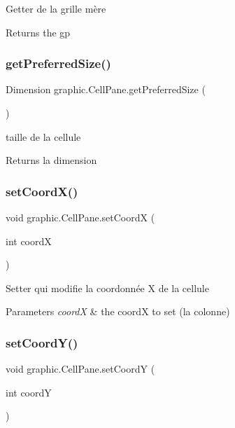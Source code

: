 Getter de la grille mère \begin{DoxyReturn}{Returns}
the gp 
\end{DoxyReturn}
\hypertarget{classgraphic_1_1_cell_pane_a0fd531a6556674de04015e906aabe03a}{}\label{classgraphic_1_1_cell_pane_a0fd531a6556674de04015e906aabe03a} 
\subsubsection{\texorpdfstring{get\+Preferred\+Size()}{getPreferredSize()}}
{\footnotesize\ttfamily Dimension graphic.\+Cell\+Pane.\+get\+Preferred\+Size (\begin{DoxyParamCaption}{ }\end{DoxyParamCaption})}

taille de la cellule \begin{DoxyReturn}{Returns}
la dimension 
\end{DoxyReturn}
\hypertarget{classgraphic_1_1_cell_pane_ad2287605b18570f3af59ada0e1feaade}{}\label{classgraphic_1_1_cell_pane_ad2287605b18570f3af59ada0e1feaade} 
\subsubsection{\texorpdfstring{set\+Coord\+X()}{setCoordX()}}
{\footnotesize\ttfamily void graphic.\+Cell\+Pane.\+set\+CoordX (\begin{DoxyParamCaption}\item[{int}]{coordX }\end{DoxyParamCaption})}

Setter qui modifie la coordonnée X de la cellule 
\begin{DoxyParams}{Parameters}
{\em coordX} & the coordX to set (la colonne) \\
\hline
\end{DoxyParams}
\hypertarget{classgraphic_1_1_cell_pane_a5f6ca9deb28ada5b1442f6b9ecb3b616}{}\label{classgraphic_1_1_cell_pane_a5f6ca9deb28ada5b1442f6b9ecb3b616} 
\subsubsection{\texorpdfstring{set\+Coord\+Y()}{setCoordY()}}
{\footnotesize\ttfamily void graphic.\+Cell\+Pane.\+set\+CoordY (\begin{DoxyParamCaption}\item[{int}]{coordY }\end{DoxyParamCaption})}

